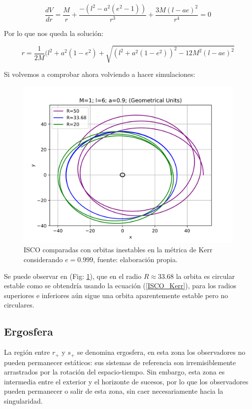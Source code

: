 \documentclass{article}
\begin{document}
\begin{equation}
    \frac{dV}{dr}=\frac{M}{r}+\frac{-(l^{2}-a^{2}(e^{2}-1))}{r^{3}}+\frac{3M(l-ae)^{2}}{r^{4}}=0
\end{equation}

Por lo que nos queda la solución:

\begin{equation}\label{ISCO_Kerr}
    r=\frac{1}{2M}(l^{2}+a^{2}(1-e^{2})+\sqrt{(l^{2}+a^{2}(1-e^{2}))^{2}-12M^{2}(l-ae)^{2}}
\end{equation}

Si volvemos a comprobar ahora volviendo a hacer simulaciones:

\begin{figure}[H]
    \centering
    \includegraphics[width=0.7\linewidth]{ISCO_Kerr.png}
    \caption{ISCO comparadas con orbitas inestables en la métrica de Kerr considerando $e=0.999$, fuente: elaboración propia.}
    \label{fig:ISCO_Kerr}
\end{figure}

Se puede observar en (Fig: \ref{fig:ISCO_Kerr}), que en el radio $R\approx33.68$ la orbita es circular estable como se obtendría usando la ecuación (\ref{ISCO_Kerr}), para los radios superiores e inferiores aún sigue una orbita aparentemente estable pero no circulares.

\subsection{Ergosfera}
La región entre $r_{+}$ y $s_{+}$ se denomina ergosfera, en esta zona los observadores no pueden permanecer estáticos: sus sistemas de referencia son irremisiblemente arrastrados por la rotación del espacio-tiempo. Sin embargo, esta zona es intermedia entre el exterior y el horizonte de sucesos, por lo que los observadores pueden permanecer o salir de esta zona, sin caer necesariamente hacia la singularidad.\cite{jeffersonagujeros}
\end{document}
